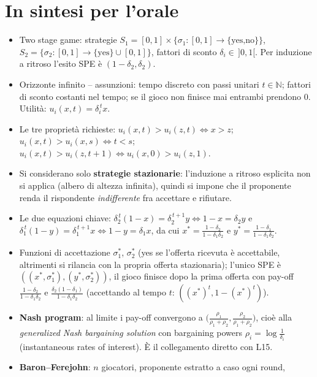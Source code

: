 \documentclass[12pt,a4paper,twoside]{book}
\theoremstyle{plain}
\theoremstyle{definition}
\begin{document}
\section*{In sintesi per l'orale}
\begin{itemize}
  \item Two stage game: strategie
        $S_1=[0,1]\times\{\sigma_1:[0,1]\to\{\text{yes,no}\}\}$,
        $S_2=\{\sigma_2:[0,1]\to\{\text{yes}\}\cup[0,1]\}$, fattori di sconto
        $\delta_i\in\,]0,1[$. Per induzione a ritroso l'esito SPE è $(1-\delta_2,\delta_2)$.
  \item Orizzonte infinito -- assunzioni: tempo discreto con passi unitari $t\in\mathbb{N}$;
        fattori di sconto costanti nel tempo; se il gioco non finisce mai entrambi prendono $0$.
        Utilità: $u_i(x,t)=\delta_i^{\,t}x$.
  \item Le tre proprietà richieste: $u_i(x,t)>u_i(z,t)\iff x>z$;
        $u_i(x,t)>u_i(x,s)\iff t<s$; $u_i(x,t)>u_i(z,t+1)\iff u_i(x,0)>u_i(z,1)$.
  \item Si considerano solo \textbf{strategie stazionarie}: l'induzione a ritroso esplicita non
        si applica (albero di altezza infinita), quindi si impone che il proponente renda il
        rispondente \emph{indifferente} fra accettare e rifiutare.
  \item Le due equazioni chiave: $\delta_2^{\,t}(1-x)=\delta_2^{\,t+1}y\iff 1-x=\delta_2y$ e
        $\delta_1^{\,t}(1-y)=\delta_1^{\,t+1}x\iff 1-y=\delta_1x$, da cui
        $x^*=\frac{1-\delta_2}{1-\delta_1\delta_2}$ e $y^*=\frac{1-\delta_1}{1-\delta_1\delta_2}$.
  \item Funzioni di accettazione $\sigma_1^*$, $\sigma_2^*$ (yes se l'offerta ricevuta è
        accettabile, altrimenti si rilancia con la propria offerta stazionaria); l'unico SPE è
        $((x^*,\sigma_1^*),(y^*,\sigma_2^*))$, il gioco finisce dopo la prima offerta con
        pay-off $\frac{1-\delta_2}{1-\delta_1\delta_2}$ e $\frac{\delta_2(1-\delta_1)}{1-\delta_1\delta_2}$
        (accettando al tempo $t$: $((x^*)^t,1-(x^*)^t)$).
  \item \textbf{Nash program}: al limite i pay-off convergono a
        $\bigl(\frac{\rho_1}{\rho_1+\rho_2},\frac{\rho_2}{\rho_1+\rho_2}\bigr)$, cioè alla
        \emph{generalized Nash bargaining solution} con bargaining powers
        $\rho_i=\log\frac{1}{\delta_i}$ (instantaneous rates of interest). È il collegamento
        diretto con L15.
  \item \textbf{Baron--Ferejohn}: $n$ giocatori, proponente estratto a caso ogni round,

\end{itemize}
\end{document}
